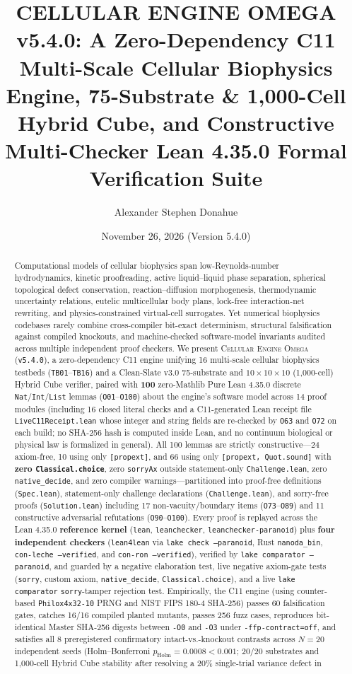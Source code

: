 \documentclass[11pt,reqno]{amsart}
\title[CELLULAR ENGINE OMEGA v5.4.0]{CELLULAR ENGINE OMEGA v5.4.0: A Zero-Dependency C11 Multi-Scale Cellular Biophysics Engine, 75-Substrate \& 1,000-Cell Hybrid Cube, and Constructive Multi-Checker Lean 4.35.0 Formal Verification Suite}
\author{Alexander Stephen Donahue}
\date{November 26, 2026 (Version 5.4.0)}
\begin{document}
\begin{abstract}
Computational models of cellular biophysics span low-Reynolds-number hydrodynamics, kinetic proofreading, active liquid--liquid phase separation, spherical topological defect conservation, reaction--diffusion morphogenesis, thermodynamic uncertainty relations, eutelic multicellular body plans, lock-free interaction-net rewriting, and physics-constrained virtual-cell surrogates. Yet numerical biophysics codebases rarely combine cross-compiler bit-exact determinism, structural falsification against compiled knockouts, and machine-checked software-model invariants audited across multiple independent proof checkers. We present \textsc{Cellular Engine Omega} (\texttt{v5.4.0}), a zero-dependency C11 engine unifying 16 multi-scale cellular biophysics testbeds (\texttt{TB01}--\texttt{TB16}) and a Clean-Slate v3.0 75-substrate and $10\times 10\times 10$ (1,000-cell) Hybrid Cube verifier, paired with \textbf{100} zero-Mathlib Pure Lean 4.35.0 discrete \texttt{Nat}/\texttt{Int}/\texttt{List} lemmas (\texttt{O01}--\texttt{O100}) about the engine's software model across 14 proof modules (including 16 closed literal checks and a C11-generated Lean receipt file \nolinkurl{LiveC11Receipt.lean} whose integer and string fields are re-checked by \texttt{O63} and \texttt{O72} on each build; no SHA-256 hash is computed inside Lean, and no continuum biological or physical law is formalized in general). All 100 lemmas are strictly constructive---24 axiom-free, 10 using only \texttt{[propext]}, and 66 using only \texttt{[propext, Quot.sound]} with \textbf{zero \texttt{Classical.choice}}, zero \texttt{sorryAx} outside statement-only \texttt{Challenge.lean}, zero \texttt{native\_decide}, and zero compiler warnings---partitioned into proof-free definitions (\texttt{Spec.lean}), statement-only challenge declarations (\texttt{Challenge.lean}), and sorry-free proofs (\texttt{Solution.lean}) including 17 non-vacuity/boundary items (\texttt{O73}--\texttt{O89}) and 11 constructive adversarial refutations (\texttt{O90}--\texttt{O100}). Every proof is replayed across the Lean 4.35.0 \textbf{reference kernel} (\texttt{lean}, \texttt{leanchecker}, \texttt{leanchecker-paranoid}) plus \textbf{four independent checkers} (\texttt{lean4lean} via \texttt{lake check --paranoid}, Rust \texttt{nanoda\_bin}, \texttt{con-leche --verified}, and \texttt{con-ron --verified}), verified by \texttt{lake comparator --paranoid}, and guarded by a negative elaboration test, live negative axiom-gate tests (\texttt{sorry}, custom axiom, \texttt{native\_decide}, \texttt{Classical.choice}), and a live \texttt{lake comparator} \texttt{sorry}-tamper rejection test. Empirically, the C11 engine (using counter-based \texttt{Philox4x32-10} PRNG and NIST FIPS 180-4 SHA-256) passes 60 falsification gates, catches 16/16 compiled planted mutants, passes 256 fuzz cases, reproduces bit-identical Master SHA-256 digests between \texttt{-O0} and \texttt{-O3} under \texttt{-ffp-contract=off}, and satisfies all 8 preregistered confirmatory intact-vs.-knockout contrasts across $N=20$ independent seeds (Holm--Bonferroni $p_{\mathrm{Holm}} = 0.0008 < 0.001$; 20/20 substrates and 1,000-cell Hybrid Cube stability after resolving a 20\% single-trial variance defect in 
\end{abstract}
\end{document}
